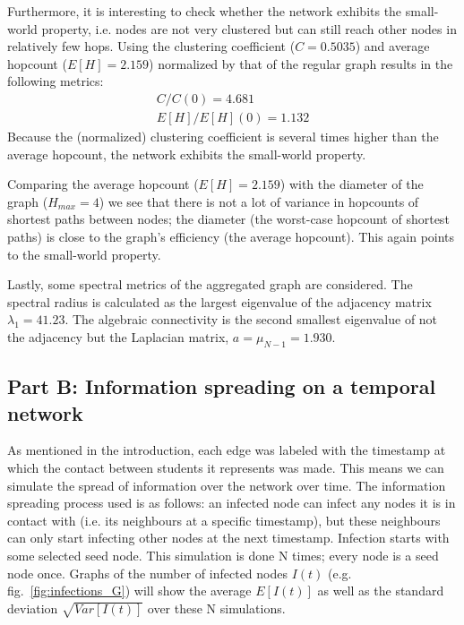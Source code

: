 \documentclass[letterpaper]{article}
\begin{document}
Furthermore, it is interesting to check whether the network exhibits the small-world property, i.e. nodes are not very clustered but can still reach other nodes in relatively few hops. Using the clustering coefficient (\(C=0.5035\)) and average hopcount (\(E[H]=2.159\)) normalized by that of the regular graph results in the following metrics: 
\begin{align*}
C/C(0) = 4.681\\
E[H]/E[H](0) = 1.132
\end{align*}
Because the (normalized) clustering coefficient is several times higher than the average hopcount, the network exhibits the small-world property. 


Comparing the average hopcount (\(E[H]=2.159\)) with the diameter of the graph (\(H_{max}=4\)) we see that there is not a lot of variance in hopcounts of shortest paths between nodes; the diameter (the worst-case hopcount of shortest paths) is close to the graph's efficiency (the average hopcount). This again points to the small-world property.

Lastly, some spectral metrics of the aggregated graph are considered. The spectral radius is calculated as the largest eigenvalue of the adjacency matrix \(\lambda_1=41.23\). The algebraic connectivity is the second smallest eigenvalue of not the adjacency but the Laplacian matrix, \(a=\mu_{N-1}=1.930\). 


\subsection*{Part B: Information spreading on a temporal network}

As mentioned in the introduction, each edge was labeled with the timestamp at which the contact between students it represents was made. This means we can simulate the spread of information over the network over time. The information spreading process used is as follows: an infected node can infect any nodes it is in contact with (i.e. its neighbours at a specific timestamp), but these neighbours can only start infecting other nodes at the next timestamp. Infection starts with some selected seed node. This simulation is done N times; every node is a seed node once. Graphs of the number of infected nodes \(I(t)\) (e.g. fig.~\ref{fig:infections_G}) will show the average \(E[I(t)]\) as well as the standard deviation \(\sqrt{Var[I(t)]}\) over these N simulations.
\end{document}
